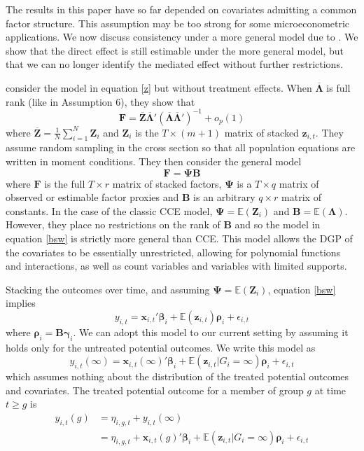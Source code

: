 \documentclass[12pt,fleqn]{article}
\def\*#1{\mathbf{#1}}
\def\+#1{\boldsymbol{#1}}
\begin{document}

The results in this paper have so far depended on covariates admitting a common factor structure. This assumption may be too strong for some microeconometric applications. We now discuss consistency under a more general model due to \citet{Brown_Schmidt_Wooldridge_2021}. We show that the direct effect is still estimable under the more general model, but that we can no longer identify the mediated effect without further restrictions.

\citet{Brown_Schmidt_Wooldridge_2021} consider the model in equation \eqref{z} but without treatment effects. When $\overline{\+\Lambda}$ is full rank (like in Assumption 6), they show that 
\begin{equation}
    \*F = \overline{\*Z} \overline{\+\Lambda}' \left( \overline{\+\Lambda} \overline{\+\Lambda}' \right)^{-1} + o_p(1)
\end{equation}
where $\overline{\*Z} = \frac{1}{N} \sum_{i = 1}^N \*Z_i$ and $\*Z_i$ is the $T \times (m + 1)$ matrix of stacked $\*z_{i,t}$. They assume random sampling in the cross section so that all population equations are written in moment conditions. They then consider the general model 
\begin{equation}\label{bsw}
    \*F = \+\Psi \*B
\end{equation}
where $\*F$ is the full $T \times r$ matrix of stacked factors, $\+\Psi$ is a $T \times q$ matrix of observed or estimable factor proxies and $\*B$ is an arbitrary $q \times r$ matrix of constants. In the case of the classic CCE model, $\+\Psi = \mathbb{E}(\*Z_i)$ and $\*B = \mathbb{E}(\+\Lambda)$. %
However, they place no restrictions on the rank of $\*B$ and so the model in equation \eqref{bsw} is strictly more general than CCE. This model allows the DGP of the covariates to be essentially unrestricted, allowing for polynomial functions and interactions, as well as count variables and variables with limited supports.

Stacking the outcomes over time, and assuming $\+\Psi = \mathbb{E}(\*Z_i)$, equation \eqref{bsw} implies 
\begin{equation}\label{bsw population}
    y_{i,t} = \*x_{i,t}' \+\beta_i + \mathbb{E}(\*z_{i,t})\+\rho_i + \epsilon_{i,t}
\end{equation}
where $\+\rho_i = \*B \+\gamma_i$. We can adopt this model to our current setting by assuming it holds only for the untreated potential outcomes. We write this model as
\begin{equation}
    y_{i,t}(\infty) = \*x_{i,t}(\infty)' \+\beta_i + \mathbb{E}(\*z_{i,t} | G_i = \infty) \+\rho_i + \epsilon_{i,t}
\end{equation}
which assumes nothing about the distribution of the treated potential outcomes and covariates. The treated potential outcome for a member of group $g$ at time $t \geq g$ is
\begin{align*}
    y_{i,t}(g) 
    &= \eta_{i,g,t} + y_{i,t}(\infty)\\
    &= \eta_{i,g,t} + \*x_{i,t}(g)' \+\beta_i + \mathbb{E}(\*z_{i,t} | G_i = \infty) \+\rho_i + \epsilon_{i,t}
\end{align*}
\end{document}
